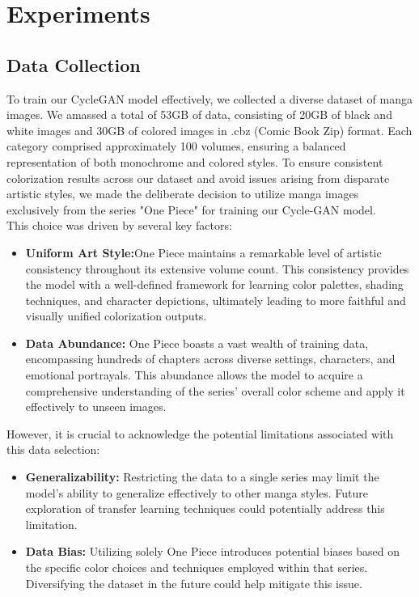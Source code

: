 \chapter{Experiments}


\section{Data Collection}
To train our CycleGAN model effectively, we collected a diverse dataset of manga images. We amassed a total of 53GB of data, consisting of 20GB of black and white images and 30GB of colored images in .cbz (Comic Book Zip) format. Each category comprised approximately 100 volumes, ensuring a balanced representation of both monochrome and colored styles.
To ensure consistent colorization results across our dataset and avoid issues arising from disparate artistic styles, we made the deliberate decision to utilize manga images exclusively from the series "One Piece" for training our Cycle-GAN model. \\
This choice was driven by several key factors:
\begin{itemize}
 \item \textbf{Uniform Art Style:}One Piece maintains a remarkable level of artistic consistency throughout its extensive volume count. This consistency provides the model with a well-defined framework for learning color palettes, shading techniques, and character depictions, ultimately leading to more faithful and visually unified colorization outputs.

\item \textbf{Data Abundance:} One Piece boasts a vast wealth of training data, encompassing hundreds of chapters across diverse settings, characters, and emotional portrayals. This abundance allows the model to acquire a comprehensive understanding of the series' overall color scheme and apply it effectively to unseen images.
\end{itemize}

However, it is crucial to acknowledge the potential limitations associated with this data selection:
\begin{itemize}
\item \textbf{Generalizability:}
Restricting the data to a single series may limit the model's ability to generalize effectively to other manga styles. Future exploration of transfer learning techniques could potentially address this limitation.
\item \textbf{Data Bias:} Utilizing solely One Piece introduces potential biases based on the specific color choices and techniques employed within that series. Diversifying the dataset in the future could help mitigate this issue.
\end{itemize}
\newpage

